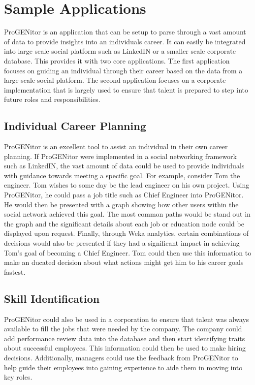 \section{Sample Applications}
\label{sect:user-stories}
ProGENitor is an application that can be setup to parse through a vast amount
of data to provide insights into an individuals career.  It can easily be
integrated into large scale social platform such as LinkedIN or a smaller scale
corporate database.  This provides it with two core applications.  The first
application focuses on guiding an individual through their career based on
the data from a large scale social platform.  The second application focuses on
a corporate implementation that is largely used to ensure that talent is
prepared to step into future roles and responsibilities.

\subsection{Individual Career Planning}
ProGENitor is an excellent tool to assist an individual in their own career
planning.  If ProGENitor were implemented in a social networking framework such
as LinkedIN, the vast amount of data could be used to provide individuals
with guidance towards meeting a specific goal.  For example, consider Tom the
engineer.  Tom wishes to some day be the lead engineer on his own project. 
Using ProGENitor, he could pass a job title such as Chief Engineer into
ProGENitor.  He would then be presented with a graph showing how other users
within the social network achieved this goal.  The most common paths would be
stand out in the graph and the significant details about each job or education
node could be displayed upon request.  Finally, through Weka analytics, certain
combinations of decisions would also be presented if they had a significant
impact in achieving Tom's goal of becoming a Chief Engineer.  Tom could then use
this information to make an  ducated decision about what actions might get him
to his career goals fastest.

\subsection{Skill Identification}
ProGENitor could also be used in a corporation to ensure that talent was always
available to fill the jobs that were needed by the company.  The company could
add performance review data into the database and then start identifying traits
about successful employees.  This information could then be used to make hiring
decisions.  Additionally, managers could use the feedback from ProGENitor to
help guide their employees into gaining experience to aide them in moving into
key roles.
	
